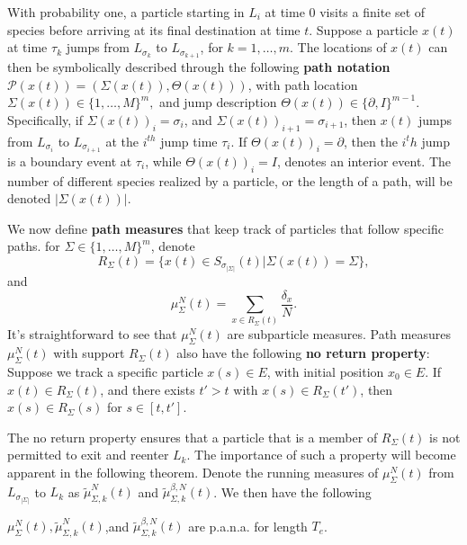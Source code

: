 With probability one, a particle starting in $L_i$ at time $0$  visits a finite set of species  before arriving at its final destination at time $t$.  Suppose a particle $x(t)$ at time $\tau_k$ jumps from $L_{\sigma_k}$ to $L_{\sigma_{k+1}}$, for $k = 1, \dots, m$.  The locations of $x(t)$ can then be symbolically described through the following \textbf{path notation} $\mathcal P (x(t)) = (\Sigma(x(t)), \Theta(x(t)))$, with path location $\Sigma(x(t)) \in \{1, \dots , M\}^m, $ and jump description $\Theta(x(t)) \in \{\partial, I\}^{m-1}$.  Specifically, if $\Sigma(x(t))_i = \sigma_i$, and $\Sigma(x(t))_{i+1} = \sigma_{i+1}$, then $x(t)$ jumps from $L_{\sigma_i}$ to $L_{\sigma_{i+1}}$ at the $i^{th}$ jump time $\tau_{i}$. If $\Theta(x(t))_i = \partial$, then the $i^th$ jump is a boundary event at $\tau_i$, while $\Theta(x(t))_i = I$, denotes an interior event. The number of different species realized by a particle, or the length of a path, will be denoted $| \Sigma(x(t))|$.

We now define  \textbf{path measures} that keep track of particles that follow specific paths. for $\Sigma \in \{1, \dots , M\}^m$, denote
\begin{equation}
R_{\Sigma}(t)  = \{x(t) \in S_{\sigma_{|\Sigma|}}(t)|\Sigma (x(t)) = \Sigma \},
\end{equation}
and
\begin{equation}
\mu^N_{\Sigma}(t)= \sum_{x\in R_\Sigma(t)} \frac{\delta_x}{N}.
\end{equation}
It's straightforward to see that  $\mu^N_\Sigma(t)$ are subparticle measures. Path measures $\mu^N_\Sigma(t)$ with support $R_{\Sigma}(t)$ also have the following \textbf{no return property}: Suppose we track a specific particle $x(s) \in E$, with initial position $x_0 \in E$. If $x(t) \in R_{\Sigma}(t)$, and there exists $t'>t$ with $x(s) \in R_{\Sigma}(t')$, then $x(s) \in R_{\Sigma}(s)$ for $s \in [t,t']$. 

 The no return property ensures that a particle that is a member of $R_{\Sigma}(t)$ is not permitted to exit and reenter $L_k$. The importance of such a property will become apparent in the following theorem.  Denote the running measures of  $\mu^N_\Sigma(t)$ from $L_{\sigma_{|\Sigma|}}$ to $L_k$ as $\tilde \mu^N_{\Sigma,k}(t)$ and $\tilde \mu^{\beta,N}_{\Sigma,k}(t)$. We then have the following

\begin{theorem} \label{paacproof}
 $\mu^N_\Sigma(t), \tilde \mu^N_{\Sigma,k}(t)$,and $\tilde \mu^{\beta,N}_{\Sigma,k}(t)$ are p.a.n.a. for length $T_e$.
\end{theorem}

